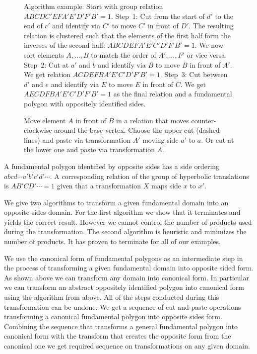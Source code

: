 \documentclass[Thesis]{subfiles}
\begin{document}
\begin{figure}
\caption{Algorithm example: Start with group relation $ABCDC' EFA'E'D'F'B' = 1$. Step~$1$: Cut from the start of $d'$ to the end of $c'$ and identify via $C'$ to move $C'$ in front of $D'$. The resulting relation is clustered such that the elements of the first half form the inverses of the second half: $ABCDEFA'E'C'D'F'B' = 1$. We now sort elements $A,\ldots,B$ to match the order of $A',\ldots,F'$ or vice versa. Step~$2$: Cut at $a'$ and $b$ and identify via $B$ to move $B$ in front of $A'$. We get relation $ACDEFBA'E'C'D'F'B' = 1$. Step~$3$: Cut between $d'$ and $e$ and identify via $E$ to move $E$ in front of $C$. We get $AECDFBA'E'C'D'F'B' = 1$ as the final relation and a fundamental polygon with oppositely identified sides.}
\label{fig:opposite_algorithm}
\end{figure}

\begin{figure}
\centering
\resizebox{0.3\textwidth}{!} {

}
\caption{Move element $A$ in front of $B$ in a relation that moves counter-clockwise around the base vertex. Choose the upper cut (dashed lines) and paste via transformation $A'$ moving side $a'$ to $a$. Or cut at the lower one and paste via transformation $A$.}
\label{fig:cut-and-paste-motion}
\end{figure}

A fundamental polygon identified by opposite sides has a side ordering $abcd\cdots a'b'c'd'\cdots$. A corresponding relation of the group of hyperbolic translations is $AB'CD'\cdots=1$ given that a transformation $X$ maps side $x$ to $x'$.

We give two algorithms to transform a given fundamental domain into an opposite sides domain.
For the first algorithm we show that it terminates and yields the correct result. However we cannot control the number of products used during the transformation. The second algorithm is heuristic and minimizes the number of products. It has proven to terminate for all of our examples.

We use the canonical form of fundamental polygons as an intermediate step in the process of transforming a given fundamental domain into opposite sided form. As shown above we can transform any domain into canonical form. In particular we can transform an abstract oppositely identified polygon into canonical form using the algorithm from above. All of the steps conducted during this transformation can be undone. We get a sequence of cut-and-paste operations transforming a canonical fundamental polygon into opposite sides form. Combining the sequence that transforms a general fundamental polygon into canonical form with the transform that creates the opposite form from the canonical one we get required sequence on transformations on any given domain.
\end{document}
